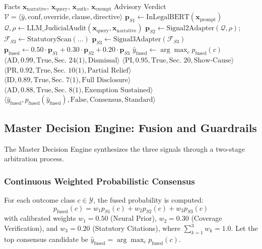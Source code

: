 \documentclass[conference]{IEEEtran}
\begin{document}
\begin{algorithm}[t]
\caption{Master Neuro-Symbolic RTI Decision Engine}
\label{alg:master}
\footnotesize
\begin{algorithmic}[1]
\REQUIRE Facts $\mathbf{x}_{\text{narrative}}$, $\mathbf{x}_{\text{query}}$, $\mathbf{x}_{\text{auth}}$, $\mathbf{x}_{\text{exempt}}$
\ENSURE Advisory Verdict $\mathcal{V} = \langle \hat{y}, \text{conf}, \text{override}, \text{clause}, \text{directive} \rangle$
\STATE $\mathbf{p}_{S1} \gets \text{InLegalBERT}(\mathbf{x}_{\text{prompt}})$
\STATE $\mathcal{Q}, \rho \gets \text{LLM\_JudicialAudit}(\mathbf{x}_{\text{query}}, \mathbf{x}_{\text{narrative}})$
\STATE $\mathbf{p}_{S2} \gets \text{Signal2Adapter}(\mathcal{Q}, \rho)$; $\mathcal{F}_{S3} \gets \text{StatutoryScan}(\dots)$
\STATE $\mathbf{p}_{S3} \gets \text{Signal3Adapter}(\mathcal{F}_{S3})$
\STATE $\mathbf{p}_{\text{fused}} \gets 0.50 \cdot \mathbf{p}_{S1} + 0.30 \cdot \mathbf{p}_{S2} + 0.20 \cdot \mathbf{p}_{S3}$
\STATE $\hat{y}_{\text{fused}} \gets \arg\max_{c} p_{\text{fused}}(c)$
    \RETURN $\langle \text{AD}, 0.99, \text{True}, \text{Sec. 24(1)}, \text{Dismissal} \rangle$
    \RETURN $\langle \text{PI}, 0.95, \text{True}, \text{Sec. 20}, \text{Show-Cause} \rangle$
    \RETURN $\langle \text{PR}, 0.92, \text{True}, \text{Sec. 10(1)}, \text{Partial Relief} \rangle$
    \RETURN $\langle \text{ID}, 0.89, \text{True}, \text{Sec. 7(1)}, \text{Full Disclosure} \rangle$
    \RETURN $\langle \text{AD}, 0.88, \text{True}, \text{Sec. 8(1)}, \text{Exemption Sustained} \rangle$
\ELSE
    \RETURN $\langle \hat{y}_{\text{fused}}, p_{\text{fused}}(\hat{y}_{\text{fused}}), \text{False}, \text{Consensus}, \text{Standard} \rangle$
\ENDIF
\end{algorithmic}
\end{algorithm}

\subsection{Master Decision Engine: Fusion and Guardrails}
The Master Decision Engine synthesizes the three signals through a two-stage arbitration process.

\subsubsection{Continuous Weighted Probabilistic Consensus}
For each outcome class $c \in \mathcal{Y}$, the fused probability is computed:
\begin{equation}
p_{\text{fused}}(c) = w_1 p_{S1}(c) + w_2 p_{S2}(c) + w_3 p_{S3}(c)
\end{equation}
with calibrated weights $w_1 = 0.50$ (Neural Prior), $w_2 = 0.30$ (Coverage Verification), and $w_3 = 0.20$ (Statutory Citations), where $\sum_{k=1}^3 w_k = 1.0$. Let the top consensus candidate be $\hat{y}_{\text{fused}} = \arg\max_{c} p_{\text{fused}}(c)$.
\end{document}
